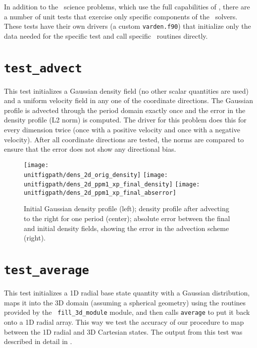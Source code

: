 
\label{chapter:unit_tests}

In addition to the \maestro\ science problems, which use the full
capabilities of \maestro, there are a number of unit tests that
exercise only specific components of the \maestro\ solvers.  These
tests have their own drivers (a custom {\tt varden.f90}) that
initialize only the data needed for the specific test and call
specific \maestro\ routines directly.


\section {\tt test\_advect}

  This test initializes a Gaussian density field (no other scalar
  quantities are used) and a uniform velocity field in any one of the
  coordinate directions.  The Gaussian profile is advected through
  the period domain exactly once and the error in the density profile
  (L2 norm) is computed.  The driver for this problem does this 
  for every dimension twice (once with a positive velocity and once
  with a negative velocity).  After all coordinate directions are 
  tested, the norms are compared to ensure that the error does
  not show any directional bias.

\begin{figure}[t] 
\centering
\texttt{[image: \\unitfigpath/dens\_2d\_orig\_density]}
\texttt{[image: \\unitfigpath/dens\_2d\_ppm1\_xp\_final\_density]}
\texttt{[image: \\unitfigpath/dens\_2d\_ppm1\_xp\_final\_abserror]} 
%
\caption[Results of the {\tt test\_advect} unit test]{\label{fig:unit:advtest}
  Initial Gaussian density profile (left); density profile after
  advecting to the right for one period (center); absolute error
  between the final and initial density fields, showing the error in
  the advection scheme (right).}
\end{figure}


\section {\tt test\_average} 

  This test initializes a 1D radial base state quantity with a
  Gaussian distribution, maps it into the 3D domain (assuming a
  spherical geometry) using the routines provided by the {\tt
    fill\_3d\_module} module, and then calls {\tt average} to put it
  back onto a 1D radial array.  This way we test the accuracy of our
  procedure to map between the 1D radial and 3D Cartesian states.
  The output from this test was described in detail in
  \cite{multilevel}.


